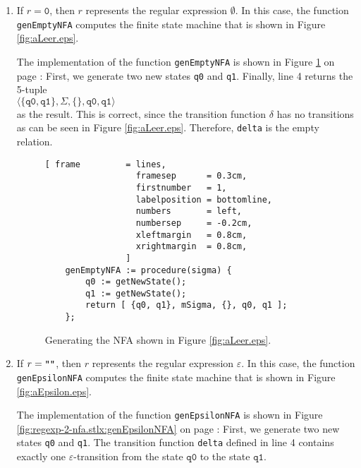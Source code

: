 \begin{enumerate}
\item If $r= \texttt{0}$, then $r$ represents the regular expression  $\emptyset$.
      In this case, the function \texttt{genEmptyNFA} computes the finite state machine that
      is shown in Figure \ref{fig:aLeer.eps}.  
      
      The implementation of the function \texttt{genEmptyNFA} is shown in Figure
      \ref{fig:regexp-2-nfa.stlx:genEmptyNFA} on page \pageref{fig:regexp-2-nfa.stlx:genEmptyNFA}:
      First, we generate two new states \texttt{q0} and \texttt{q1}.  
      Finally, line 4 returns the 5-tuple
      \\[0.2cm]
      \hspace*{1.3cm}
      $\langle \{\texttt{q0}, \texttt{q1}\}, \Sigma, \{\}, \texttt{q0}, \texttt{q1} \rangle$
      \\[0.2cm]
      as the result.  This is correct, since the transition function $\delta$ has no transitions
      as can be seen in Figure \ref{fig:aLeer.eps}.  Therefore,
      \texttt{delta} is the empty  relation.



\begin{figure}[!ht]
\centering
\begin{Verbatim}[ frame         = lines, 
                  framesep      = 0.3cm, 
                  firstnumber   = 1,
                  labelposition = bottomline,
                  numbers       = left,
                  numbersep     = -0.2cm,
                  xleftmargin   = 0.8cm,
                  xrightmargin  = 0.8cm,
                ]
    genEmptyNFA := procedure(sigma) {
        q0 := getNewState();
        q1 := getNewState();
        return [ {q0, q1}, mSigma, {}, q0, q1 ];
    };
\end{Verbatim}
\vspace*{-0.3cm}
\caption{Generating the NFA shown in Figure \ref{fig:aLeer.eps}.}
\label{fig:regexp-2-nfa.stlx:genEmptyNFA}
\end{figure}

\item If $r = \texttt{\symbol{34}\symbol{34}}$, then $r$ represents the regular expression
      $\varepsilon$.  In this case, the function \texttt{genEpsilonNFA} computes the finite state
      machine that is shown in Figure \ref{fig:aEpsilon.eps}.

      The implementation of the function \texttt{genEpsilonNFA} is shown in Figure
      \ref{fig:regexp-2-nfa.stlx:genEpsilonNFA} on page \pageref{fig:regexp-2-nfa.stlx:genEpsilonNFA}:
      First, we generate two new states \texttt{q0} and \texttt{q1}.  The transition function
      \texttt{delta} defined in line 4 contains exactly one
      $\varepsilon$-transition from the state $\mathtt{q0}$ to the state $\mathtt{q1}$.
      


\end{enumerate}
